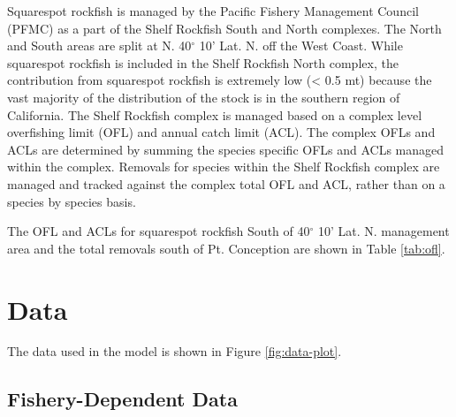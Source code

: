 \documentclass[11pt,
  english,
  a4paper,
]{article}
\begin{document}
Squarespot rockfish is managed by the Pacific Fishery Management Council (PFMC) as a part of the Shelf Rockfish South and North complexes. The North and South areas are split at N. 40{\(^\circ\)\leavevmode\tagmcend\tagstructend} 10' Lat. N. off the West Coast. While squarespot rockfish is included in the Shelf Rockfish North complex, the contribution from squarespot rockfish is extremely low (\textless{} 0.5 mt) because the vast majority of the distribution of the stock is in the southern region of California. The Shelf Rockfish complex is managed based on a complex level overfishing limit (OFL) and annual catch limit (ACL). The complex OFLs and ACLs are determined by summing the species specific OFLs and ACLs managed within the complex. Removals for species within the Shelf Rockfish complex are managed and tracked against the complex total OFL and ACL, rather than on a species by species basis.

\leavevmode\tagmcend\tagstructend\par


The OFL and ACLs for squarespot rockfish South of 40{\(^\circ\)\leavevmode\tagmcend\tagstructend} 10' Lat. N. management area and the total removals south of Pt. Conception are shown in Table \ref{tab:ofl}.

\leavevmode\tagmcend\tagstructend\par


\hypertarget{data}{%
\section{Data}\label{data}}

\leavevmode\tagmcend\tagstructend


The data used in the model is shown in Figure \ref{fig:data-plot}.

\leavevmode\tagmcend\tagstructend\par


\hypertarget{fishery-dependent-data}{%
\subsection{Fishery-Dependent Data}\label{fishery-dependent-data}}
\end{document}

